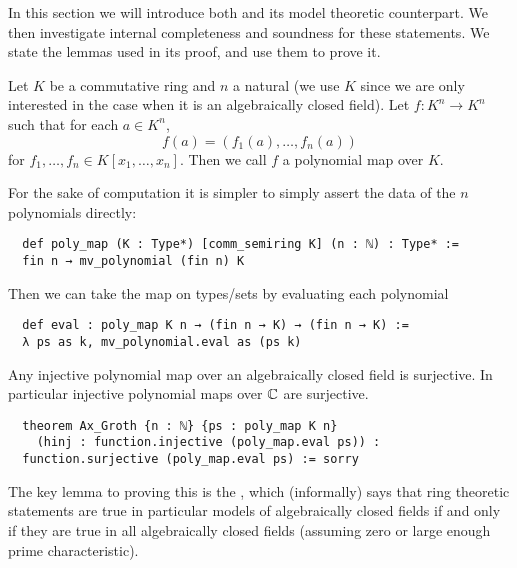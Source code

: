 In this section we will introduce both  and
its model theoretic counterpart.
We then investigate internal completeness and soundness for these statements.
We state the lemmas used in its proof, and use them to prove it.

\begin{dfn}
  Let $K$ be a commutative ring and $n$ a natural
  (we use $K$ since we are only interested in the case
  when it is an algebraically closed field).
  Let $f : K^n \to K^n$ such that for each $a \in K^n$,
  \[f(a) = (f_1(a), \dots, f_n(a))\] for
  $f_1, \dots, f_n \in K[x_1, \dots, x_n]$.
  Then we call $f$ a polynomial map over $K$.

  For the sake of computation it is simpler to simply assert
  the data of the $n$ polynomials directly:

  \begin{lstlisting}
  def poly_map (K : Type*) [comm_semiring K] (n : ℕ) : Type* :=
  fin n → mv_polynomial (fin n) K \end{lstlisting}

  Then we can take the map on types/sets by evaluating each polynomial
  \begin{lstlisting}
  def eval : poly_map K n → (fin n → K) → (fin n → K) :=
  λ ps as k, mv_polynomial.eval as (ps k) \end{lstlisting}
\end{dfn}

\begin{prop}[Ax-Grothendieck]
    Any injective polynomial map over an algebraically closed field is surjective.
    In particular injective polynomial maps over $\mathbb{C}$ are surjective.

\begin{lstlisting}
  theorem Ax_Groth {n : ℕ} {ps : poly_map K n}
    (hinj : function.injective (poly_map.eval ps)) :
  function.surjective (poly_map.eval ps) := sorry \end{lstlisting}
\end{prop}

The key lemma to proving this is the ,
which (informally) says that ring theoretic statements are true in particular models
of algebraically closed fields if and only if they are true in all algebraically closed fields
(assuming zero or large enough prime characteristic).

